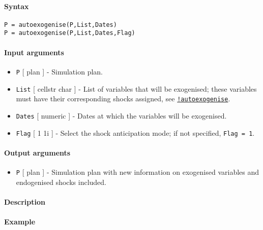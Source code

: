 


	\paragraph{Syntax}\label{syntax}

\begin{verbatim}
P = autoexogenise(P,List,Dates)
P = autoexogenise(P,List,Dates,Flag)
\end{verbatim}

\paragraph{Input arguments}\label{input-arguments}

\begin{itemize}
\item
  \texttt{P} {[} plan {]} - Simulation plan.
\item
  \texttt{List} {[} cellstr \textbar{} char {]} - List of variables that
  will be exogenised; these variables must have their corresponding
  shocks assigned, see
  \href{modellang/autoexogenise}{\texttt{!autoexogenise}}.
\item
  \texttt{Dates} {[} numeric {]} - Dates at which the variables will be
  exogenised.
\item
  \texttt{Flag} {[} 1 \textbar{} 1i {]} - Select the shock anticipation
  mode; if not specified, \texttt{Flag = 1}.
\end{itemize}

\paragraph{Output arguments}\label{output-arguments}

\begin{itemize}
\itemsep1pt\parskip0pt
\item
  \texttt{P} {[} plan {]} - Simulation plan with new information on
  exogenised variables and endogenised shocks included.
\end{itemize}

\paragraph{Description}\label{description}

\paragraph{Example}\label{example}


